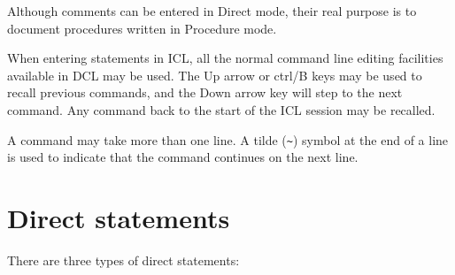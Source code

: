 Although comments can be entered in Direct mode, their real purpose is to
document procedures written in Procedure mode.

When entering statements in ICL, all the normal command line editing facilities
available in DCL may be used.
The Up arrow or ctrl/B keys may be used to recall previous commands, and the
Down arrow key will step to the next command.
Any command back to the start of the ICL session may be recalled.

A command may take more than one line.
A tilde (\verb+~+) symbol at the end of a line is used to indicate that the
command continues on the next line.

\section{Direct statements}
\label{S_dirstm}

There are three types of direct statements:

